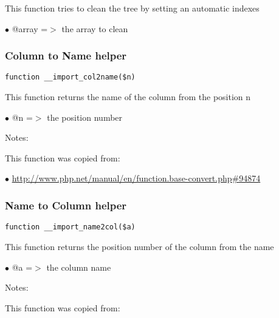 \documentclass[a4paper]{article}
\def\htmladdnormallink#1#2{\href{#2}{#1}}
\begin{document}
This function tries to clean the tree by setting an automatic indexes

\begin{compactitem}
\item[\color{myblue}$\bullet$] @array =$>$ the array to clean
\end{compactitem}

\hypertarget{toc477}{}
\subsubsection{Column to Name helper}

\begin{lstlisting}
function __import_col2name($n)
\end{lstlisting}

This function returns the name of the column from the position n

\begin{compactitem}
\item[\color{myblue}$\bullet$] @n =$>$ the position number
\end{compactitem}

Notes:

This function was copied from:

\begin{compactitem}
\item[\color{myblue}$\bullet$] \htmladdnormallink{http://www.php.net/manual/en/function.base-convert.php\#94874}{http://www.php.net/manual/en/function.base-convert.php\#94874}
\end{compactitem}

\hypertarget{toc478}{}
\subsubsection{Name to Column helper}

\begin{lstlisting}
function __import_name2col($a)
\end{lstlisting}

This function returns the position number of the column from the name

\begin{compactitem}
\item[\color{myblue}$\bullet$] @a =$>$ the column name
\end{compactitem}

Notes:

This function was copied from:
\end{document}
